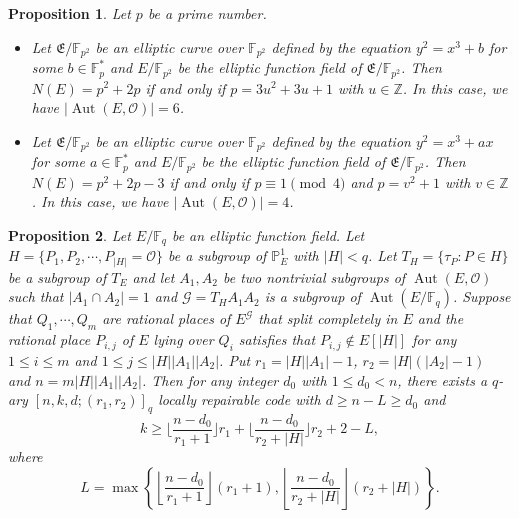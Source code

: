\documentclass[10pt,a4paper]{amsart}
\newtheorem{proposition}{Proposition}
\begin{document}
\begin{proposition}\label{new_ellp_cuv}
    Let \( p \) be a  prime number.
    \begin{itemize}
        \item[(i)] Let \( \mathfrak{E}/\mathbb{F}_{p^2} \) be an elliptic curve over \( \mathbb{F}_{p^2} \) defined by the equation \( y^2 = x^3 + b \) for some \( b \in \mathbb{F}_{p}^* \) and \( E/\mathbb{F}_{p^2} \) be the elliptic function field of \( \mathfrak{E}/\mathbb{F}_{p^2} \). Then \(N(E) = {p^2} + 2p\) if and only if \(p = 3u^2 + 3u + 1\) with \(u\in\mathbb{Z}\). In this case, we have \(|\operatorname{Aut}(E, \mathcal{O})| = 6\). 
        \item[(ii)] Let \( \mathfrak{E}/\mathbb{F}_{p^2} \) be an elliptic curve over \( \mathbb{F}_{p^2} \) defined by the equation \( y^2 = x^3 + ax \) for some \( a \in \mathbb{F}_{p}^* \) and \( E/\mathbb{F}_{p^2} \) be the elliptic function field of \( \mathfrak{E}/\mathbb{F}_{p^2} \). Then \(N(E) = {p^2} + 2p - 3\) if and only if \( p \equiv 1 \pmod{4} \) and \(p = v^2 + 1\) with \(v\in\mathbb{Z}\). In this case, we have \(|\operatorname{Aut}(E, \mathcal{O})| = 4\). 
    \end{itemize}
\end{proposition}

\begin{proposition}\label{cons_lrc_two}
    Let \( E/\mathbb{F}_q \) be an elliptic function field. Let \(H = \{P_1,P_2,\cdots,P_{|H|} = \mathcal{O}\}\) be a subgroup of \( \mathbb{P}^1_E \) with \( |H|<q \). Let \( T_H = \{\tau_P:P\in H\} \) be a subgroup of \( T_E \) and let \( A_1,A_2 \) be two nontrivial subgroups of \( \operatorname{Aut}(E, \mathcal{O}) \) such that \(|A_1\cap A_2| = 1\) and \( \mathcal{G} = T_H A_1 A_2 \) is a subgroup of \( \operatorname{Aut}(E/\mathbb{F}_q) \). Suppose that \( Q_1, \cdots, Q_m \) are rational places of \( E^{\mathcal{G}} \) that split completely in \( E \) and the rational place $P_{i,j}$ of $E$ lying over $Q_i$ satisfies that \(P_{i,j}\notin E[|H|]\) for any $1\le i\le m$ and \(1\le j\le |H||A_1||A_2|\). Put \( r_1 = |H||A_1| - 1 \), \( r_2 = |H|(|A_2| - 1)\) and \( n = m|H||A_1||A_2| \). Then for any integer \( d_0 \) with \( 1 \leq d_0 < n \), there exists a \( q \)-ary \([n, k, d; (r_1, r_2)]_q\) locally repairable code with \(d \ge n - L\ge d_0\) and  
    \[
        k \geq \bigg\lfloor\frac{n-d_0}{r_1 + 1}\bigg\rfloor r_1 + \bigg\lfloor\frac{n-d_0}{r_2 + |H|}\bigg\rfloor r_2  + 2 - L,
    \]
    where
    \[
        L =  \max\left\{\left\lfloor\frac{n-d_0}{r_1 + 1}\right\rfloor (r_1+1),\left\lfloor\frac{n-d_0}{r_2 + |H|}\right\rfloor (r_2 + |H|)\right\}.  
    \]
\end{proposition}
\end{document}

